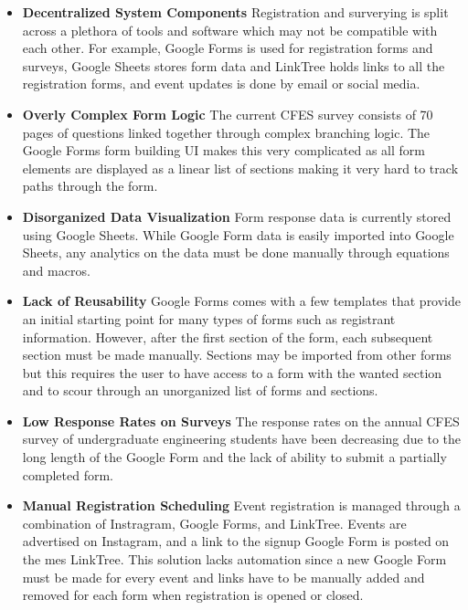 \documentclass[12pt]{article}
\begin{document}
\begin{itemize}
  \item \textbf{Decentralized System Components} Registration and surverying is split across a plethora of tools and software which may not be compatible with each other. For example, Google Forms is used for registration forms and surveys, Google Sheets stores form data and LinkTree holds links to all the registration forms, and event updates is done by email or social media.
  \item \textbf{Overly Complex Form Logic} The current CFES survey consists of 70 pages of questions linked together through complex branching logic. The Google Forms form building UI makes this very complicated as all form elements are displayed as a linear list of sections making it very hard to track paths through the form.
  \item \textbf{Disorganized Data Visualization} Form response data is currently stored using Google Sheets. While Google Form data is easily imported into Google Sheets, any analytics on the data must be done manually through equations and macros.
  \item \textbf{Lack of Reusability} Google Forms comes with a few templates that provide an initial starting point for many types of forms such as registrant information. However, after the first section of the form, each subsequent section must be made manually. Sections may be imported from other forms but this requires the user to have access to a form with the wanted section and to scour through an unorganized list of forms and sections.
  \item \textbf{Low Response Rates on Surveys} The response rates on the annual CFES survey of undergraduate engineering students have been decreasing due to the long length of the Google Form and the lack of ability to submit a partially completed form.
  \item \textbf{Manual Registration Scheduling} Event registration is managed through a combination of Instragram, Google Forms, and LinkTree. Events are advertised on Instagram, and a link to the signup Google Form is posted on the \gls{mes} LinkTree. This solution lacks automation since a new Google Form must be made for every event and links have to be manually added and removed for each form when registration is opened or closed.
\end{itemize}
%
\end{document}
